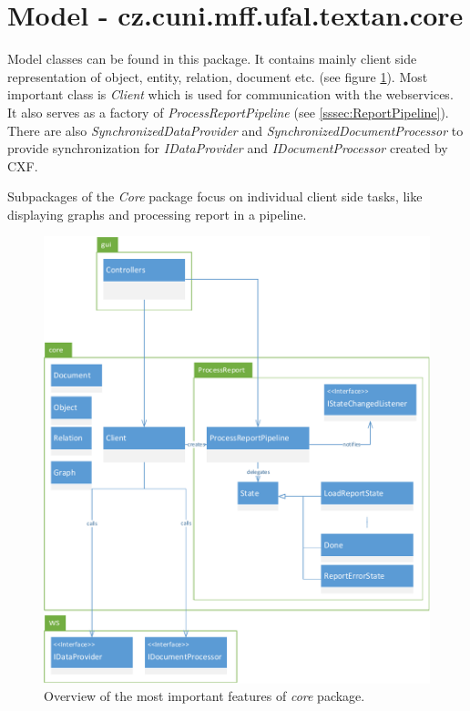 \section{Model - cz.cuni.mff.ufal.textan.core}

Model classes can be found in this package. It contains mainly client side
representation of object, entity, relation, document etc. (see figure \ref{fig:CorePackage}). Most important class
is \emph{Client} which is used for communication with the webservices. It also
serves as a factory of \emph{ProcessReportPipeline} (see
\ref{sssec:ReportPipeline}). There are also \emph{SynchronizedDataProvider} and
\emph{SynchronizedDocumentProcessor} to provide synchronization for
\emph{IDataProvider} and \emph{IDocumentProcessor} created by CXF.

Subpackages of the \emph{Core} package focus on individual client side tasks,
like displaying graphs and processing report in a pipeline.

\begin{figure}[!htb]
        \centering
        \includegraphics[width=\textwidth]{Images/CorePackage}
        \caption{Overview of the most important features of \emph{core} package.}
        \label{fig:CorePackage}
\end{figure}

